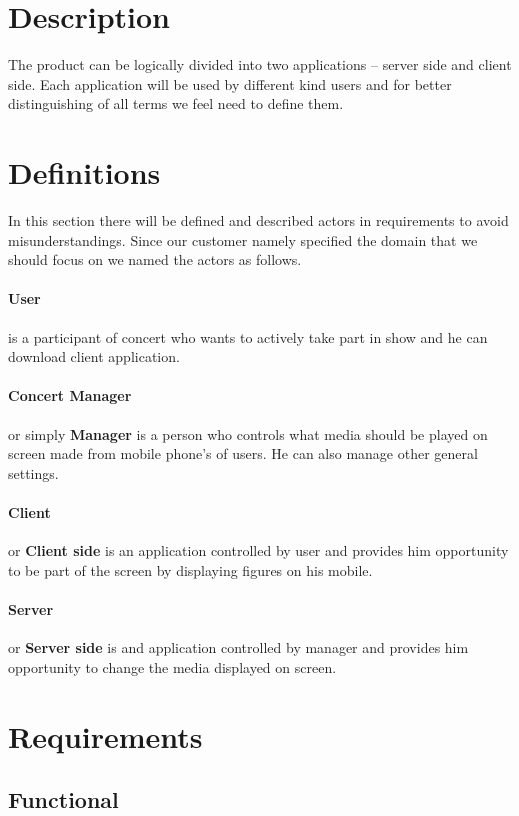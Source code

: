 \section{Description}
The product can be logically divided into two applications -- server side  and client side.
Each application will be used by different kind users and for better distinguishing of all terms we feel need to define them.

\section{Definitions}
In this section there will be defined and described actors in requirements to avoid misunderstandings. Since our customer namely specified the domain that we should focus on we named the actors as follows.

\paragraph{User} is a participant of concert who wants to actively take part in show and he can download client application.

\paragraph{Concert Manager} or simply \textbf{Manager} is a person who controls what media should be played on screen made from mobile phone's of users. 
He can also manage other general settings.

\paragraph{Client} or \textbf{Client side} is an application controlled by user and provides him opportunity to be part of the screen by displaying figures on his mobile.

\paragraph{Server} or \textbf{Server side} is and application controlled by manager and provides him opportunity to change the media displayed on screen.

\section{Requirements}
\subsection{Functional}

